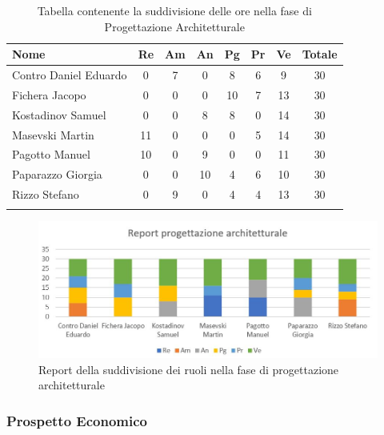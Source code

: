 \documentclass[../piano_di_progetto.tex]{subfiles}
\begin{document}
\begin{center}
	\begin{longtable}{|l|c|c|c|c|c|c|c|}
		\hline
		\rowcolor{lightgray}
		\textbf{Nome} & \textbf{Re} & \textbf{Am} & \textbf{An} & \textbf{Pg}  & \textbf{Pr}   & \textbf{Ve} & \textbf{Totale} \\

		\hline
			Contro Daniel Eduardo & 0 & 7 & 0 & 8 & 6 & 9 & 30\\
		\hline
			Fichera Jacopo & 0 & 0 & 0 & 10 & 7 & 13 & 30 \\
		\hline
			Kostadinov Samuel & 0 & 0 & 8 & 8 & 0 & 14 & 30 \\			
		\hline
			Masevski Martin 	& 11 & 0 & 0 & 0 & 5 & 14 & 30\\
		\hline
			Pagotto Manuel & 10 & 0 & 9 & 0 & 0 & 11 & 30 \\			
		\hline
			Paparazzo Giorgia & 0 & 0 & 10 & 4 & 6 & 10 & 30 \\
		\hline
			Rizzo Stefano & 0 & 9 & 0 & 4 & 4 & 13 & 30\\
		\hline	
		\rowcolor{white}
		\caption{Tabella contenente la suddivisione delle ore nella fase di Progettazione Architetturale}
	\end{longtable}
\end{center}

\begin{figure}[H]
\centering
\includegraphics[width=12cm]{componenti/img/report_prog_arc}
\caption{Report della suddivisione dei ruoli nella fase di progettazione architetturale}
\end{figure}

\subsubsection{Prospetto Economico}
\end{document}
